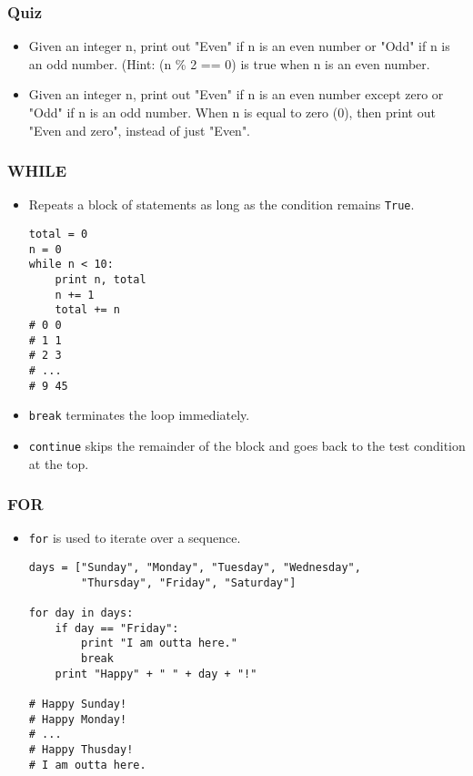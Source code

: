 \documentclass{beamer}
\begin{document}
\begin{frame}[fragile]
\frametitle{Quiz}
\begin{itemize}
\item Given an integer n, print out "Even" if n is an
    even number or "Odd" if n is an odd number. (Hint:
    (n \% 2 == 0) is true when n is an even number.
\item Given an integer n, print out "Even" if n is an
    even number except zero or "Odd" if n is an odd number.
    When n is equal to zero (0), then print out "Even and zero",
    instead of just "Even".
\end{itemize}
\end{frame}

\begin{frame}[fragile]
\frametitle{WHILE}
\begin{itemize}
\item Repeats a block of statements
      as long as the condition remains \lstinline{True}.
\begin{lstlisting}
total = 0
n = 0
while n < 10:
    print n, total
    n += 1
    total += n
# 0 0
# 1 1
# 2 3
# ...
# 9 45
\end{lstlisting}
\item \lstinline{break} terminates the loop
      immediately.
\item \lstinline{continue} skips the remainder
      of the block and goes back to the test 
      condition at the top.
\end{itemize}
\end{frame}

\begin{frame}[fragile]
\frametitle{FOR}
\begin{itemize}
\item \lstinline{for} is used to iterate over a
      sequence.
\begin{lstlisting}
days = ["Sunday", "Monday", "Tuesday", "Wednesday",
        "Thursday", "Friday", "Saturday"]

for day in days:
    if day == "Friday":
        print "I am outta here."
        break
    print "Happy" + " " + day + "!"

# Happy Sunday!
# Happy Monday!
# ...
# Happy Thusday!
# I am outta here.
\end{lstlisting}
\end{itemize}
\end{frame}
\end{document}
